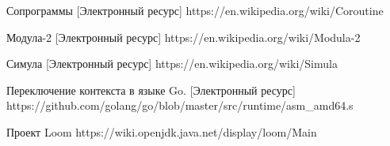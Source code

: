 \begingroup 
\renewcommand{\section}[2]{\anonsection{Библиографический список}}
\begin{thebibliography}{00}

    Сопрограммы
    [Электронный ресурс] 
    https://en.wikipedia.org/wiki/Coroutine

	Модула-2
	[Электронный ресурс] 
	https://en.wikipedia.org/wiki/Modula-2
	
	Симула
	[Электронный ресурс]
	https://en.wikipedia.org/wiki/Simula
	
	
	Переключение контекста в языке Go.
	[Электронный ресурс]
	https://github.com/golang/go/blob/master/src/runtime/asm\_amd64.s
	
	Проект Loom
	https://wiki.openjdk.java.net/display/loom/Main
\end{thebibliography}
\endgroup

\clearpage
